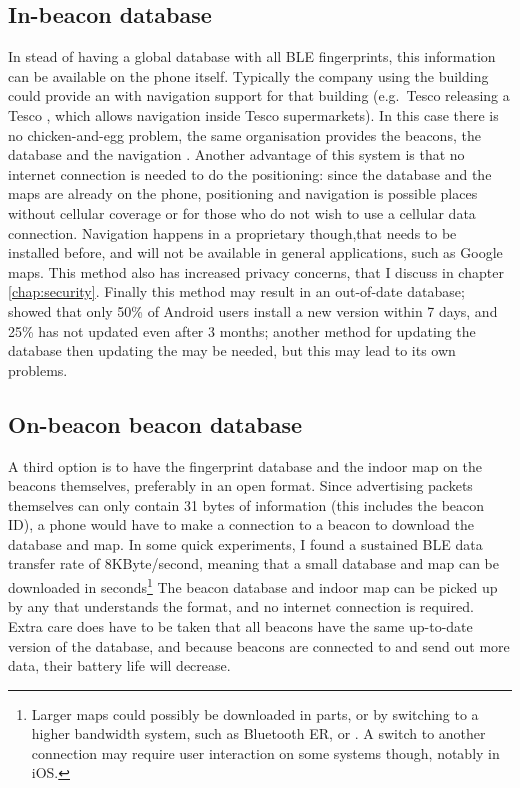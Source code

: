 \subsection{In-\app beacon database}
In stead of having a global database with all BLE fingerprints, this information can be available on the phone itself.
Typically the company using the building could provide an \app with navigation support for that building (e.g.\ Tesco releasing a Tesco \app, which allows navigation inside Tesco supermarkets).
In this case there is no chicken-and-egg problem, the same organisation provides the beacons, the database and the navigation \app.
Another advantage of this system is that no internet connection is needed to do the positioning: since the database and the maps are already on the phone, positioning and navigation is possible places without cellular coverage or for those who do not wish to use a cellular data connection.
Navigation happens in a proprietary \app though,that needs to be installed before, and will not be available in general applications, such as Google maps.
This method also has increased privacy concerns, that I discuss in chapter \ref{chap:security}.
Finally this method may result in an out-of-date database; \citet{moller2012update} showed that only 50\% of Android users install a new \app version within 7 days, and 25\% has not updated even after 3 months; another method for updating the database then updating the \app may be needed, but this may lead to its own problems.

\subsection{On-beacon beacon database}
A third option is to have the fingerprint database and the indoor map on the beacons themselves, preferably in an open format.
Since advertising packets themselves can only contain 31 bytes of information (this includes the beacon ID), a phone would have to make a connection to a beacon to download the database and map.
In some quick experiments, I found a sustained BLE data transfer rate of 8KByte/second, meaning that a small database and map can be downloaded in seconds\footnote{Larger maps could possibly be downloaded in parts, or by switching to a higher bandwidth system, such as Bluetooth ER, or \wifi. A switch to another connection may require user interaction on some systems though, notably in iOS.}
The beacon database and indoor map can be picked up by any \app that understands the format, and no internet connection is required.
Extra care does have to be taken that all beacons have the same up-to-date version of the database, and because beacons are connected to and send out more data, their battery life will decrease.

